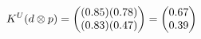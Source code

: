 \documentclass[preview]{standalone}
\begin{document}
\begin{align*}
\special{dvisvgm:raw <g id='unique000'>}K^U(d \otimes p) = \begin{pmatrix} (0.85)(0.78) \\ (0.83)(0.47) \end{pmatrix} = \begin{pmatrix} 0.67 \\ 0.39 \end{pmatrix}\special{dvisvgm:raw </g>}
\end{align*}
\end{document}
